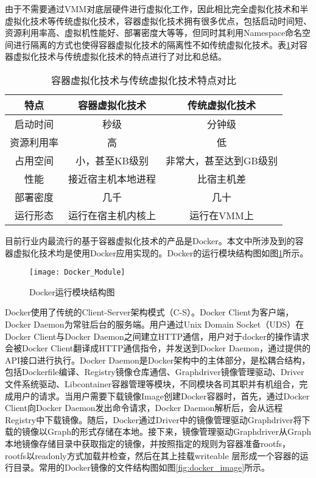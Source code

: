 由于不需要通过VMM对底层硬件进行虚拟化工作，因此相比完全虚拟化技术和半虚拟化技术等传统虚拟化技术，容器虚拟化技术拥有很多优点，包括启动时间短、资源利用率高、虚拟机性能好、部署密度大等等，但同时其利用Namespace命名空间进行隔离的方式也使得容器虚拟化技术的隔离性不如传统虚拟化技术。表\ref{tab:compare_container_virtualization}对容器虚拟化技术与传统虚拟化技术的特点进行了对比和总结\cite{2019操作系统虚拟化的研究现状与展望}。

\begin{table}[!htbp]
    \centering
    \caption{容器虚拟化技术与传统虚拟化技术特点对比}\label{tab:compare_container_virtualization}
    \renewcommand\arraystretch{1.5} 
\begin{tabular}{*{3}{c}}
    \hline
    特点& 容器虚拟化技术& 传统虚拟化技术\\
    \hline
    启动时间& 秒级& 分钟级 \\
    资源利用率 &高& 低 \\
    占用空间 &小，甚至KB级别& 非常大，甚至达到GB级别 \\
    性能 &接近宿主机本地进程& 比宿主机差 \\
    部署密度 &几千& 几十 \\
    运行形态 &运行在宿主机内核上& 运行在VMM上 \\
    \hline
   
   \end{tabular}
\end{table}

目前行业内最流行的基于容器虚拟化技术的产品是Docker\citep{bernstein2014containers,马晓光2017一种适用于}。本文中所涉及到的容器虚拟化技术均是使用Docker应用实现的。Docker的运行模块结构图如图\ref{fig:docker_module}所示。

\begin{figure}[!htbp]
    \centering
    \texttt{[image: Docker\_Module]}
    \caption{Docker运行模块结构图}
    \label{fig:docker_module}
\end{figure}

Docker使用了传统的Client-Server架构模式（C-S）。Docker Client为客户端，Docker Daemon为常驻后台的服务端。用户通过Unix Domain Socket（UDS）在Docker Client与Docker Daemon之间建立HTTP通信，用户对于docker的操作请求会被Docker Client翻译成HTTP通信指令，并发送到Docker Daemon，通过提供的API接口进行执行。Docker Daemon是Docker架构中的主体部分，是松耦合结构，包括Dockerfile编译、Registry镜像仓库通信、Graphdriver镜像管理驱动、Driver文件系统驱动、Libcontainer容器管理等模块，不同模块各司其职并有机组合，完成用户的请求。当用户需要下载镜像Image创建Docker容器时，首先，通过Docker Client向Docker Daemon发出命令请求，Docker Daemon解析后，会从远程Registry中下载镜像。随后，Docker通过Driver中的镜像管理驱动Graphdriver将下载的镜像以Graph的形式存储在本地。接下来，镜像管理驱动Graphdriver从Graph本地镜像存储目录中获取指定的镜像，并按照指定的规则为容器准备rootfs，rootfs以readonly方式加载并检查，然后在其上挂载writeable 层形成一个容器的运行目录。常用的Docker镜像的文件结构图如图\ref{fig:docker_image}所示。

